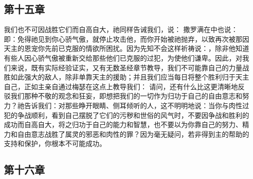 
\subsection{第十五章}

\par

我们也不可因战胜它们而自高自大，祂同样告诫我们，说： 撒罗满在中也说：即：免得祂见到你心骄气傲，就停止攻击他，而你开始被祂抛弃，以致再次被那因天主的恩宠你先前已克服的情欲所困扰。因为先知不会这样祈祷说：，除非他知道有些人因心骄气傲被重新交给那些他们已克服的过犯，为使他们谦卑。因此，对我们来说，既有实际经验证实，又有无数圣经章节教导，我们不可能靠自己的力量战胜如此强大的敌人，除非单靠天主的援助；并且我们应当每日将整个胜利归于天主自己，正如主亲自通过梅瑟在这点上教导我们： 请问，还有什么比这更清晰地反驳我们那种不敬的观念和狂妄，即想把我们的一切作为归功于自己的自由意志和努力？祂告诉我们：对那些睁开眼睛、侧耳倾听的人，这不明明地说：当你与肉性过犯的争战顺利，看到自己摆脱了它们的污秽和世俗的风气时，不要因争战和胜利的成功而自高自大，将之归功于自己的能力和智慧，也不要以为你靠自己的努力、精力和自由意志战胜了属灵的邪恶和肉性的罪？因为毫无疑问，若非得到主的帮助的支持和保护，你根本不可能成功。\par


\subsection{第十六章}

\par

